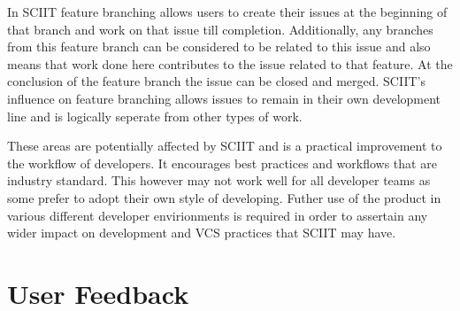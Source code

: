 \documentclass{mproj}
\begin{document}
In SCIIT feature branching allows users to create their issues at the beginning of that branch and work on that issue till completion. Additionally, any branches from this feature branch can be considered to be related to this issue and also means that work done here contributes to the issue related to that feature. At the conclusion of the feature branch the issue can be closed and merged. SCIIT's influence on feature branching allows issues to remain in their own development line and is logically seperate from other types of work.

These areas are potentially affected by SCIIT and is a practical improvement to the workflow of developers. It encourages best practices and workflows that are industry standard. This however may not work well for all developer teams as some prefer to adopt their own style of developing. Futher use of the product in various different developer envirionments is required in order to assertain any wider impact on development and VCS practices that SCIIT may have.

\section{User Feedback}










\end{document}
